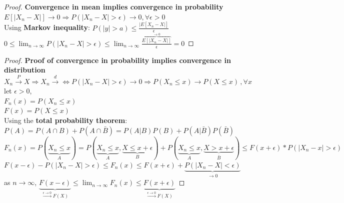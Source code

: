 \begin{proof}\textbf{Convergence in mean implies convergence in probability}\\

    $E[|X_n-X|]\to 0 \Rightarrow P(|X_n-X|>\epsilon)\to 0, \forall\epsilon>0$\\

    Using \textbf{Markov inequality}: $\displaystyle P(|y|>a)\leq \frac{|E[X_n-X|]}{\epsilon}$\\

    $\displaystyle 0 \leq \lim_{n\to\infty}P(|X_n-X|>\epsilon)\leq \lim_{n\to\infty}\frac{\overbrace{E[|X_n-X|]}^{\to 0}}{\epsilon}=0$
\end{proof}

\begin{proof}\textbf{Proof of convergence in probability implies convergence in distribution}\\
    
    $X_n\xrightarrow{P}X\Rightarrow X_n\xrightarrow{d} \Leftrightarrow P(|X_n-X|>\epsilon)\to 0 \Rightarrow P(X_n\leq x)\to P(X\leq x)\, ,\forall x$\\

    let $\epsilon>0$,\\

    $F_n(x)=P(X_n\leq x)$\\

    $F(x)=P(X\leq x)$\\

    Using the \textbf{total probability theorem}: $P(A) = P(A\cap B)+P(A\cap\bar{B}) = P(A|B)P(B)+P(A|\bar{B})P(\bar{B})$\\

    $F_n(x) = P(\underbrace{X_n\leq x}_{A}) 
    = P(\underbrace{X_n\leq x}_{A}, \underbrace{X\leq x+\epsilon}_{B}) 
    + P(\underbrace{X_n\leq x}_{A}, \underbrace{X>x+\epsilon}_{\bar{B}}) 
    \leq F(x+\epsilon) * P(|X_n-x|>\epsilon)$\\

    $F(x-\epsilon)-P(|X_n-X|>\epsilon)\leq F_n(x)\leq F(x+\epsilon)+\underbrace{P(|X_n-X|<\epsilon)}_{\to 0}$\\

    as $n\to\infty$, $\displaystyle \underbrace{F(x-\epsilon)}_{\xrightarrow{\epsilon\to 0} F(X)}\leq \lim_{n\to\infty}F_n(x)\leq \underbrace{F(x+\epsilon)}_{\xrightarrow{\epsilon\to 0} F(X)}$
\end{proof}

